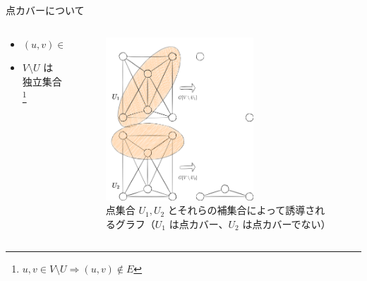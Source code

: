 \documentclass[aspectratio=169]{beamer}
\begin{document}
\begin{frame}{点カバーについて}
	\begin{columns}
		\begin{column}{0.4\textwidth}
			\begin{itemize}
				\item \((u, v) \in E \Rightarrow u \in U \lor v \in U\)
			\end{itemize}
			\begin{itemize}
				\item \(V \setminus U\) は独立集合\footnote{\(u, v \in V \setminus U \Rightarrow (u, v) \notin E\)}
			\end{itemize}
		\end{column}
		\begin{column}{0.6\textwidth}
			\begin{figure}
				\centering
				\includegraphics[width=0.65\textwidth]{figures/vertex-cover.png}
				\caption{点集合 \(U_1, U_2\) とそれらの補集合によって誘導されるグラフ（\(U_1\) は点カバー、\(U_2\) は点カバーでない）}
			\end{figure}
		\end{column}
	\end{columns}
\end{frame}
\end{document}

